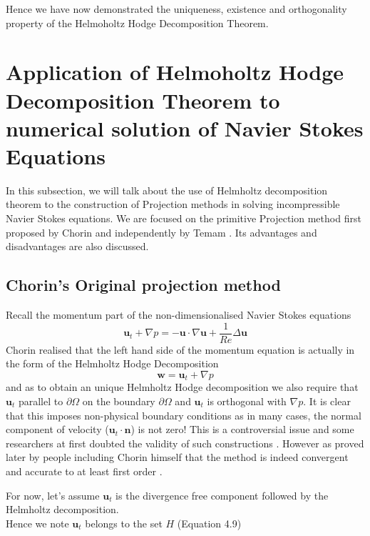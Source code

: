 Hence we have now demonstrated the uniqueness, existence and orthogonality property of the Helmoholtz Hodge Decomposition Theorem.

\newpage
\section{Application of Helmoholtz Hodge Decomposition Theorem to numerical solution of Navier Stokes Equations}
In this subsection, we will talk about the use of Helmholtz decomposition theorem to the construction of Projection methods in solving incompressible Navier Stokes equations. We are focused on the primitive Projection method first proposed by Chorin and independently by Temam \cite{chorin1968numerical,temam1969approximation,brown2001accurate}. Its advantages and disadvantages are also discussed.\\

\subsection{Chorin's Original projection method}
Recall the momentum part of the non-dimensionalised Navier Stokes equations
\begin{equation}
\textbf{u}_t + \nabla \textit{p} = - \textbf{u} \cdot \nabla \textbf{u} + \dfrac{1}{Re} \Delta \textbf{u}
\end{equation}
Chorin realised that the left hand side of the momentum equation is actually in the form of the Helmholtz Hodge Decomposition \cite{chorin1968numerical,chorin1990mathematical,brown2001accurate}
\begin{equation}
\textbf{w} = \textbf{u}_t + \nabla \textit{p} 
\end{equation}
and as to obtain an unique Helmholtz Hodge decomposition we also require that $\textbf{u}_t$ parallel to $\partial \Omega$ on the boundary $\partial \Omega$ and $\textbf{u}_t$ is orthogonal with $\nabla p$. It is clear that this imposes non-physical boundary conditions as in many cases, the normal component of velocity ($\textbf{u}_t \cdot \textbf{n}$) is not zero! This is a controversial issue and some researchers at first doubted the validity of such constructions \cite{perot1993analysis,brown2001accurate,shen1992error}. However as proved later by people including Chorin himself that the method is indeed convergent and accurate to at least first order \cite{chorin1969convergence,shen1992error,rannacher1992chorin,perot1993analysis,brown2001accurate}. 

For now, let's assume $\textbf{u}_t$ is the divergence free component followed by the Helmholtz decomposition.\\
Hence we note $\textbf{u}_t$ belongs to the set $H$ (Equation 4.9)



